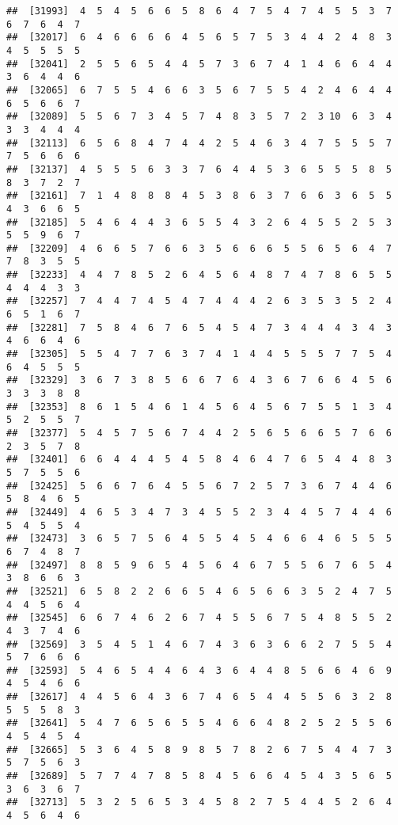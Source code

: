 \documentclass[
]{book}
\begin{document}
\begin{verbatim}
##  [31993]  4  5  4  5  6  6  5  8  6  4  7  5  4  7  4  5  5  3  7  6  7  6  4  7
##  [32017]  6  4  6  6  6  6  4  5  6  5  7  5  3  4  4  2  4  8  3  4  5  5  5  5
##  [32041]  2  5  5  6  5  4  4  5  7  3  6  7  4  1  4  6  6  4  4  3  6  4  4  6
##  [32065]  6  7  5  5  4  6  6  3  5  6  7  5  5  4  2  4  6  4  4  6  5  6  6  7
##  [32089]  5  5  6  7  3  4  5  7  4  8  3  5  7  2  3 10  6  3  4  3  3  4  4  4
##  [32113]  6  5  6  8  4  7  4  4  2  5  4  6  3  4  7  5  5  5  7  7  5  6  6  6
##  [32137]  4  5  5  5  6  3  3  7  6  4  4  5  3  6  5  5  5  8  5  8  3  7  2  7
##  [32161]  7  1  4  8  8  8  4  5  3  8  6  3  7  6  6  3  6  5  5  4  3  6  6  5
##  [32185]  5  4  6  4  4  3  6  5  5  4  3  2  6  4  5  5  2  5  3  5  5  9  6  7
##  [32209]  4  6  6  5  7  6  6  3  5  6  6  6  5  5  6  5  6  4  7  7  8  3  5  5
##  [32233]  4  4  7  8  5  2  6  4  5  6  4  8  7  4  7  8  6  5  5  4  4  4  3  3
##  [32257]  7  4  4  7  4  5  4  7  4  4  4  2  6  3  5  3  5  2  4  6  5  1  6  7
##  [32281]  7  5  8  4  6  7  6  5  4  5  4  7  3  4  4  4  3  4  3  4  6  6  4  6
##  [32305]  5  5  4  7  7  6  3  7  4  1  4  4  5  5  5  7  7  5  4  6  4  5  5  5
##  [32329]  3  6  7  3  8  5  6  6  7  6  4  3  6  7  6  6  4  5  6  3  3  3  8  8
##  [32353]  8  6  1  5  4  6  1  4  5  6  4  5  6  7  5  5  1  3  4  5  2  5  5  7
##  [32377]  5  4  5  7  5  6  7  4  4  2  5  6  5  6  6  5  7  6  6  2  3  5  7  8
##  [32401]  6  6  4  4  4  5  4  5  8  4  6  4  7  6  5  4  4  8  3  5  7  5  5  6
##  [32425]  5  6  6  7  6  4  5  5  6  7  2  5  7  3  6  7  4  4  6  5  8  4  6  5
##  [32449]  4  6  5  3  4  7  3  4  5  5  2  3  4  4  5  7  4  4  6  5  4  5  5  4
##  [32473]  3  6  5  7  5  6  4  5  5  4  5  4  6  6  4  6  5  5  5  6  7  4  8  7
##  [32497]  8  8  5  9  6  5  4  5  6  4  6  7  5  5  6  7  6  5  4  3  8  6  6  3
##  [32521]  6  5  8  2  2  6  6  5  4  6  5  6  6  3  5  2  4  7  5  4  4  5  6  4
##  [32545]  6  6  7  4  6  2  6  7  4  5  5  6  7  5  4  8  5  5  2  4  3  7  4  6
##  [32569]  3  5  4  5  1  4  6  7  4  3  6  3  6  6  2  7  5  5  4  5  7  6  6  6
##  [32593]  5  4  6  5  4  4  6  4  3  6  4  4  8  5  6  6  4  6  9  4  5  4  6  6
##  [32617]  4  4  5  6  4  3  6  7  4  6  5  4  4  5  5  6  3  2  8  5  5  5  8  3
##  [32641]  5  4  7  6  5  6  5  5  4  6  6  4  8  2  5  2  5  5  6  4  5  4  5  4
##  [32665]  5  3  6  4  5  8  9  8  5  7  8  2  6  7  5  4  4  7  3  5  7  5  6  3
##  [32689]  5  7  7  4  7  8  5  8  4  5  6  6  4  5  4  3  5  6  5  3  6  3  6  7
##  [32713]  5  3  2  5  6  5  3  4  5  8  2  7  5  4  4  5  2  6  4  4  5  6  4  6

\end{verbatim}
\end{document}
